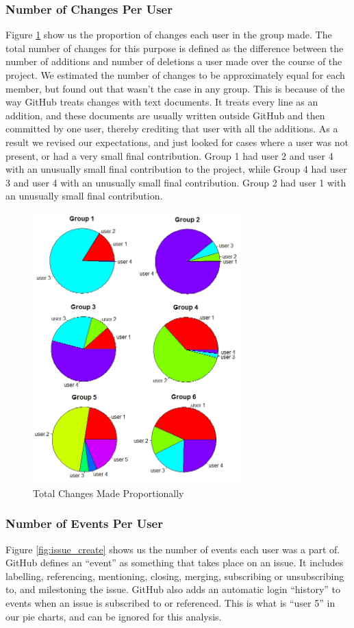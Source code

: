 \documentclass{acm_proc_article-sp}
\begin{document}
\subsubsection{Number of Changes Per User}
Figure \ref{fig:changes_made} show us the proportion of changes each user in the group made. The total number of changes for this purpose is defined as the difference between the number of additions and number of deletions a user made over the course of the project. We estimated the number of changes to be approximately equal for each member, but found out that wasn't the case in any group. This is because of the way GitHub treats changes with text documents. It treats every line as an addition, and these documents are usually written outside GitHub and then committed by one user, thereby crediting that user with all the additions. As a result we revised our expectations, and just looked for cases where a user was not present, or had a very small final contribution. Group 1 had user 2 and user 4 with an unusually small final contribution to the project, while Group 4 had user 3 and user 4 with an unusually small final contribution. Group 2 had user 1 with an unusually small final contribution. 

\begin{figure}[h]
\centering
\includegraphics[width=8cm]{img/change_made}
\caption{Total Changes Made Proportionally}
\label{fig:changes_made}
\end{figure}

\subsubsection{Number of Events Per User}\label{sec:events_user}
Figure \ref{fig:issue_create} shows us the number of events each user was a part of. GitHub defines an ``event'' as something that takes place on an issue. It includes labelling, referencing, mentioning, closing, merging, subscribing or unsubscribing to, and milestoning the issue. GitHub also adds an automatic login ``history'' to events when an issue is subscribed to or referenced. This is what is ``user 5'' in our pie charts, and can be ignored for this analysis. 
\end{document}
